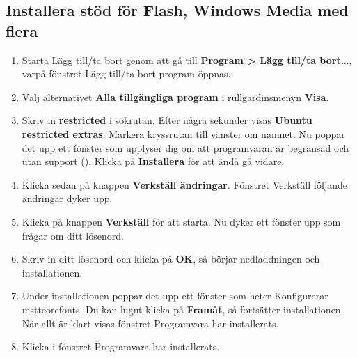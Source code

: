 \documentclass[a4paper,final]{memoir} %
\begin{document}
\subsection{Installera stöd för Flash, Windows Media med flera}\label{restricted}


\begin{enumerate}

\item Starta Lägg till/ta bort genom att gå till \textbf{Program \textgreater{} Lägg till/ta bort\ldots{}}, varpå fönstret Lägg till/ta bort program öppnas.
\item Välj alternativet \textbf{Alla tillgängliga program} i rullgardinsmenyn \textbf{Visa}. 
\item Skriv in \textbf{restricted} i sökrutan. Efter några sekunder visas \textbf{Ubuntu restricted extras}. Markera kryssrutan till vänster om namnet. Nu poppar det upp ett fönster som upplyser dig om att programvaran är begränsad och utan support (). Klicka på \textbf{Installera} för att ändå gå vidare.
\item Klicka sedan på knappen \textbf{Verkställ ändringar}. Fönstret Verkställ följande ändringar dyker upp.
\item Klicka på knappen \textbf{Verkställ} för att starta. Nu dyker ett fönster upp som frågar om ditt lösenord.
\item Skriv in ditt lösenord och klicka på \textbf{OK}, så börjar nedladdningen och installationen. 
\item Under installationen poppar det upp ett fönster som heter Konfigurerar msttcorefonts. Du kan lugnt klicka på \textbf{Framåt}, så fortsätter installationen. När allt är klart visas fönstret Programvara har installerats. 
\item Klicka \xstang{} i fönstret Programvara har installerats. 

\end{enumerate}

\end{document}

